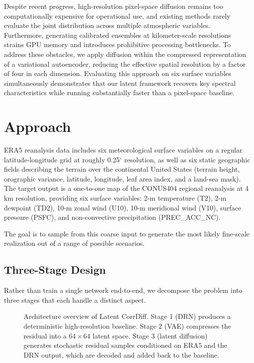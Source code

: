 \documentclass[10pt]{article}
\begin{document}
Despite recent progress, high-resolution pixel-space diffusion remains too computationally expensive for operational use, and existing methods rarely evaluate the joint distribution across multiple atmospheric variables. Furthermore, generating calibrated ensembles at kilometer-scale resolutions strains GPU memory and introduces prohibitive processing bottlenecks. To address these obstacles, we apply diffusion within the compressed representation of a variational autoencoder, reducing the effective spatial resolution by a factor of four in each dimension. Evaluating this approach on six surface variables simultaneously demonstrates that our latent framework recovers key spectral characteristics while running substantially faster than a pixel-space baseline.

\section{Approach}

ERA5 reanalysis data includes six meteorological surface variables on a regular latitude-longitude grid at roughly 0.25$^\circ$ resolution, as well as six static geographic fields describing the terrain over the continental United States (terrain height, orographic variance, latitude, longitude, leaf area index, and a land-sea mask). The target output is a one-to-one map of the CONUS404 regional reanalysis at 4\,km resolution, providing six surface variables: 2-m temperature (T2), 2-m dewpoint (TD2), 10-m zonal wind (U10), 10-m meridional wind (V10), surface pressure (PSFC), and non-convective precipitation (PREC\_ACC\_NC).

The goal is to sample from this coarse input to generate the most likely fine-scale realization out of a range of possible scenarios.

\subsection{Three-Stage Design}

Rather than train a single network end-to-end, we decompose the problem into three stages that each handle a distinct aspect.

\begin{figure}[h]
  \centering
  
  \caption{Architecture overview of Latent CorrDiff. Stage 1 (DRN) produces a
           deterministic high-resolution baseline. Stage 2 (VAE) compresses the
           residual into a $64\times64$ latent space. Stage 3 (latent diffusion)
           generates stochastic residual samples conditioned on ERA5 and the DRN
           output, which are decoded and added back to the baseline.}
  \label{fig:architecture}
\end{figure}
\end{document}
